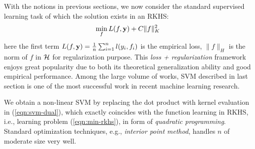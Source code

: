 With the notions in previous sections, we now consider the standard supervised learning task of which the solution exists in an RKHS:
\begin{equation}
\min_{f}L(f,\y)+C\|f\|^2_K \label{eqn:min-rkhs}
\end{equation}
here the first term $L(f,\mathbf{y})=\frac{1}{n}\sum_{i=1}^nl(y_i,f_i)$ is the empirical loss, $\|f\|_H$ is the norm of $f$ in ${\cal H}$ for regularization purpose. This {\em loss + regularization} framework enjoys great popularity due to both its theoretical generalization ability and good empirical performance. Among the large volume of works, SVM described in last section is one of the most successful work in recent machine learning research\cite{ml/CortesV95,datamine/Burges98,ss/MoguerzaM06}.


We obtain a non-linear SVM by replacing the dot product with kernel evaluation in (\ref{eqn:svm-dual}), which exactly coincides with the function learning in RKHS, i.e., learning problem (\ref{eqn:min-rkhs}), in form of {\em quadratic programming}\cite{Boyd}. Standard optimization techniques, e.g., {\em interior point method}, handles $n$ of moderate size very well.

